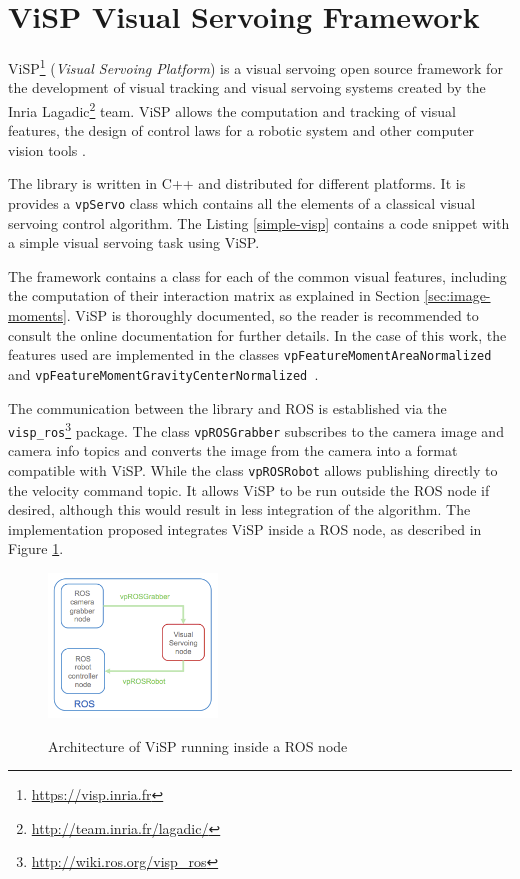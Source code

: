 \section{ViSP Visual Servoing Framework}
\label{sec:visp}

ViSP\footnote{\url{https://visp.inria.fr}} (\emph{Visual Servoing Platform}) is a visual servoing open source framework for the development of visual tracking and visual servoing systems created by the Inria Lagadic\footnote{\url{http://team.inria.fr/lagadic/}} team. ViSP allows the computation and tracking of visual features, the design of control laws for a robotic system and other computer vision tools \cite{visp_hp}.


The library is written in C++ and distributed for different platforms. It is provides a \texttt{vpServo} class which contains all the elements of a classical visual servoing control algorithm. The Listing \ref{simple-visp} contains a code snippet with a simple visual servoing task using ViSP.

The framework contains a class for each of the common visual features, including the computation of their interaction matrix as explained in Section \ref{sec:image-moments}. ViSP is thoroughly documented, so the reader is recommended to consult the online documentation\cite{visp_doc} for further details. In the case of this work, the features used are implemented in the classes \texttt{vpFeatureMomentAreaNormalized} and \texttt{vpFeatureMomentGravityCenterNormalized }.

The communication between the library and ROS is established via the \texttt{visp\_ros}\footnote{\url{http://wiki.ros.org/visp_ros}} package. The class \texttt{vpROSGrabber} subscribes to the camera image and camera info topics and converts the image from the camera into a format compatible with ViSP. While the class \texttt{vpROSRobot} allows publishing directly to the velocity command topic. It allows ViSP to be run outside the ROS node if desired, although this would result in less integration of the algorithm. The implementation proposed integrates ViSP inside a ROS node, as described in Figure \ref{fig:visual-servo-ros-node}.
  

\begin{figure}[!htb]
	\caption[Architecture of ViSP running inside a ROS node]{Architecture of ViSP running inside a ROS node~\protect\cite{visp_ros}}
	\centering
	\includegraphics[width=0.4\textwidth]{content/chapter_05/images/visual-servo-ros-node.png}
	\label{fig:visual-servo-ros-node}
\end{figure}

